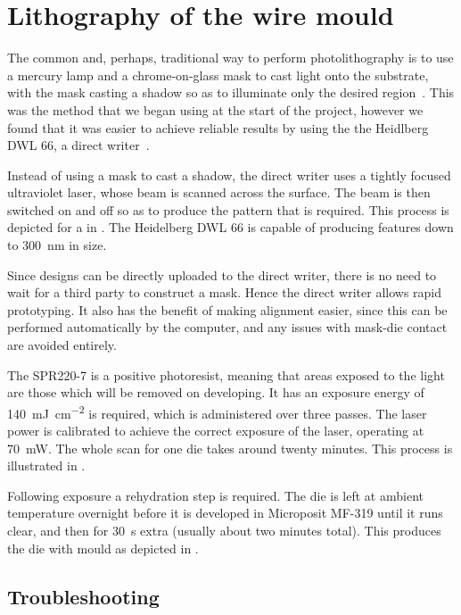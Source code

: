 \section{Lithography of the wire mould}

The common and, perhaps, traditional way to perform photolithography is to use
a mercury lamp and a chrome-on-glass mask to cast light onto the
substrate, with the mask casting a shadow so as to illuminate only the desired
region~\cite{Madou2002}. This was the method that we began using at the start of the
project, however we found that it was easier to achieve reliable results by
using the the Heidlberg DWL 66, a direct writer~\cite{}. 

Instead of using a mask to cast a shadow, the direct writer uses a tightly
focused ultraviolet laser, whose beam is scanned across the surface. The
beam is then switched on and off so as to produce the pattern that is required.
This process is depicted for a in . The Heidelberg
DWL 66 is capable of producing features down to \SI{300}{\nano\meter} in size.

Since designs can be directly uploaded to the direct writer, there is no need
to wait for a third party to construct a mask.  Hence the direct writer allows
rapid prototyping. It also has the benefit of making alignment easier, since
this can be performed automatically by the computer, and any issues with
mask-die contact are avoided entirely. 

The SPR220-7 is a positive photoresist, meaning that areas exposed to the light
are those which will be removed on developing. It has an exposure energy of
\SI{140}{\milli\joule\per\square\centi\meter} is required, which is
administered over three passes. The laser power is calibrated to achieve the
correct exposure of the laser, operating at \SI{70}{\milli\watt}. The
whole scan for one die takes around twenty minutes. This process is illustrated
in .

Following exposure a rehydration step is required. The die is left at ambient
temperature overnight before it is developed in Microposit MF-319 until it runs
clear, and then for \SI{30}{\second} extra (usually about two minutes total).
This produces the die with mould as depicted in
.

\subsection{Troubleshooting}

